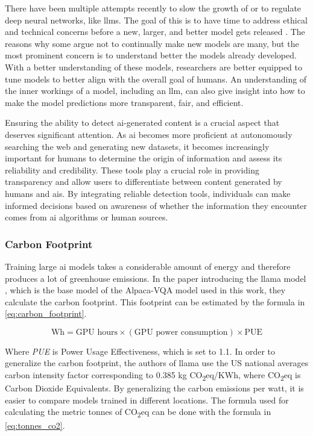 There have been multiple attempts recently to slow the growth of or to regulate deep neural networks, like \glspl{llm}. The goal of this is to have time to address ethical and technical concerns before a new, larger, and better model gets released \cite{PauseGiantAI, REGULATIONEUROPEANPARLIAMENT2021}. The reasons why some argue not to continually make new models are many, but the most prominent concern is to understand better the models already developed. With a better understanding of these models, researchers are better equipped to tune models to better align with the overall goal of humans. An understanding of the inner workings of a model, including an \gls{llm}, can also give insight into how to make the model predictions more transparent, fair, and efficient. 

Ensuring the ability to detect \gls{ai}-generated content is a crucial aspect that deserves significant attention. As \gls{ai} becomes more proficient at autonomously searching the web and generating new datasets, it becomes increasingly important for humans to determine the origin of information and assess its reliability and credibility. These tools play a crucial role in providing transparency and allow users to differentiate between content generated by humans and \glspl{ai}. By integrating reliable detection tools, individuals can make informed decisions based on awareness of whether the information they encounter comes from \gls{ai} algorithms or human sources.


\subsubsection{Carbon Footprint}
Training large \gls{ai} models takes a considerable amount of energy and therefore produces a lot of greenhouse emissions.  
In the paper introducing the \gls{llama} model \cite{touvronLLaMAOpenEfficient2023}, which is the base model of the Alpaca-VQA model used in this work, they calculate the carbon footprint. This footprint can be estimated by the formula in \autoref{eq:carbon_footprint}.

\begin{equation}
    \text{Wh} = \text{GPU hours} \times (\text{GPU power consumption}) \times \text{PUE}
    \label{eq:carbon_footprint}
\end{equation}

Where \textit{PUE} is Power Usage Effectiveness, which is set to 1.1.
In order to generalize the carbon footprint, the authors of \gls{llama} use the US national averages carbon intensity factor corresponding to 0.385 kg CO\textsubscript{2}eq/KWh, where CO\textsubscript{2}eq is Carbon Dioxide Equivalents. By generalizing the carbon emissions per watt, it is easier to compare models trained in different locations.
The formula used for calculating the metric tonnes of CO\textsubscript{2}eq can be done with the formula in \autoref{eq:tonnes_co2}.

